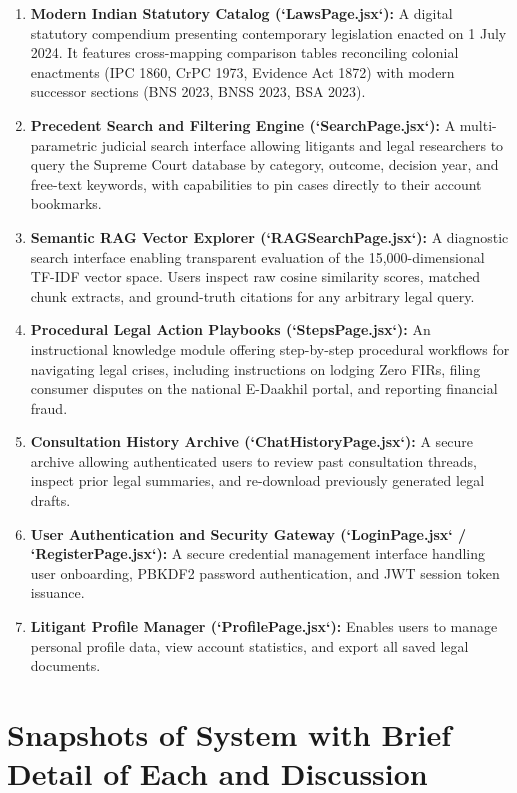 \begin{enumerate}
    \item \textbf{Modern Indian Statutory Catalog (`LawsPage.jsx`):}
    A digital statutory compendium presenting contemporary legislation enacted on 1 July 2024. It features cross-mapping comparison tables reconciling colonial enactments (IPC 1860, CrPC 1973, Evidence Act 1872) with modern successor sections (BNS 2023, BNSS 2023, BSA 2023).

    \item \textbf{Precedent Search and Filtering Engine (`SearchPage.jsx`):}
    A multi-parametric judicial search interface allowing litigants and legal researchers to query the Supreme Court database by category, outcome, decision year, and free-text keywords, with capabilities to pin cases directly to their account bookmarks.

    \item \textbf{Semantic RAG Vector Explorer (`RAGSearchPage.jsx`):}
    A diagnostic search interface enabling transparent evaluation of the 15,000-dimensional TF-IDF vector space. Users inspect raw cosine similarity scores, matched chunk extracts, and ground-truth citations for any arbitrary legal query.

    \item \textbf{Procedural Legal Action Playbooks (`StepsPage.jsx`):}
    An instructional knowledge module offering step-by-step procedural workflows for navigating legal crises, including instructions on lodging Zero FIRs, filing consumer disputes on the national E-Daakhil portal, and reporting financial fraud.

    \item \textbf{Consultation History Archive (`ChatHistoryPage.jsx`):}
    A secure archive allowing authenticated users to review past consultation threads, inspect prior legal summaries, and re-download previously generated legal drafts.

    \item \textbf{User Authentication and Security Gateway (`LoginPage.jsx` / `RegisterPage.jsx`):}
    A secure credential management interface handling user onboarding, PBKDF2 password authentication, and JWT session token issuance.

    \item \textbf{Litigant Profile Manager (`ProfilePage.jsx`):}
    Enables users to manage personal profile data, view account statistics, and export all saved legal documents.
\end{enumerate}

\section{Snapshots of System with Brief Detail of Each and Discussion}
\label{sec:system_snapshots}

